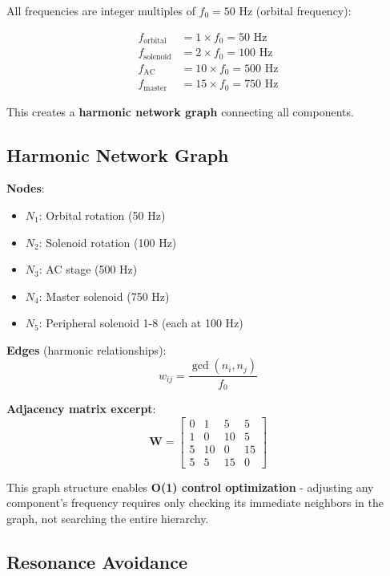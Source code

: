 \documentclass[12pt,a4paper]{article}
\begin{document}
All frequencies are integer multiples of $f_0 = 50$ Hz (orbital frequency):

\begin{align}
f_{\text{orbital}} &= 1 \times f_0 = 50 \text{ Hz} \\
f_{\text{solenoid}} &= 2 \times f_0 = 100 \text{ Hz} \\
f_{\text{AC}} &= 10 \times f_0 = 500 \text{ Hz} \\
f_{\text{master}} &= 15 \times f_0 = 750 \text{ Hz}
\end{align}

This creates a \textbf{harmonic network graph} connecting all components.

\subsection{Harmonic Network Graph}

\textbf{Nodes}:
\begin{itemize}
\item $N_1$: Orbital rotation (50 Hz)
\item $N_2$: Solenoid rotation (100 Hz)
\item $N_3$: AC stage (500 Hz)
\item $N_4$: Master solenoid (750 Hz)
\item $N_5$: Peripheral solenoid 1-8 (each at 100 Hz)
\end{itemize}

\textbf{Edges} (harmonic relationships):
\begin{equation}
w_{ij} = \frac{\gcd(n_i, n_j)}{f_0}
\end{equation}

\textbf{Adjacency matrix excerpt}:
\begin{equation}
\mathbf{W} = \begin{bmatrix}
0 & 1 & 5 & 5 \\
1 & 0 & 10 & 5 \\
5 & 10 & 0 & 15 \\
5 & 5 & 15 & 0
\end{bmatrix}
\end{equation}

This graph structure enables \textbf{O(1) control optimization} - adjusting any component's frequency requires only checking its immediate neighbors in the graph, not searching the entire hierarchy.

\subsection{Resonance Avoidance}
\end{document}
